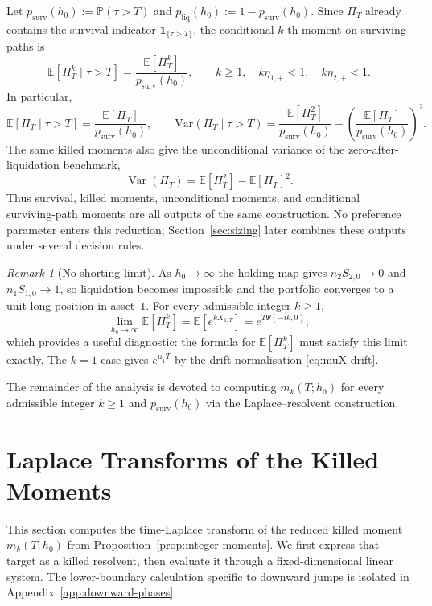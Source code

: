 \documentclass[11pt]{article}
\newcommand{\E}{\mathbb{E}}
\renewcommand{\P}{\mathbb{P}}
\newcommand{\one}{\mathbf{1}}
\theoremstyle{plain}
\theoremstyle{definition}
\theoremstyle{remark}
\newtheorem{remark}{Remark}
\begin{document}
Let $p_{\mathrm{surv}}(h_0):=\P(\tau>T)$ and $p_{\mathrm{liq}}(h_0):=1-p_{\mathrm{surv}}(h_0)$.
Since $\Pi_T$ already contains the survival indicator $\one_{\{\tau>T\}}$, the conditional $k$-th
moment on surviving paths is
\[
\E[\Pi_T^k\mid\tau>T]
=
\frac{\E[\Pi_T^k]}{p_{\mathrm{surv}}(h_0)},
\qquad k\ge 1,\quad k\eta_{1,+}<1,\quad k\eta_{2,+}<1.
\]
In particular,
\[
\E[\Pi_T\mid\tau>T]
=
\frac{\E[\Pi_T]}{p_{\mathrm{surv}}(h_0)},
\qquad
\mathrm{Var}(\Pi_T\mid\tau>T)
=
\frac{\E[\Pi_T^2]}{p_{\mathrm{surv}}(h_0)}
-
\left(\frac{\E[\Pi_T]}{p_{\mathrm{surv}}(h_0)}\right)^{\!2}.
\]
The same killed moments also give the unconditional variance of the zero-after-liquidation
benchmark,
\[
\operatorname{Var}(\Pi_T)=\E[\Pi_T^2]-\E[\Pi_T]^2.
\]
Thus survival, killed moments, unconditional moments, and conditional surviving-path
moments are all outputs of the same construction. No preference parameter enters this
reduction; Section~\ref{sec:sizing} later combines these outputs under several
decision rules.

\begin{remark}[No-shorting limit]\label{rem:no-shorting}
As $h_0\to\infty$ the holding map gives $n_2 S_{2,0}\to 0$ and $n_1 S_{1,0}\to 1$, so liquidation
becomes impossible and the portfolio converges to a unit long position in asset~$1$. For every
admissible integer $k\ge 1$,
\[
\lim_{h_0\to\infty}\E[\Pi_T^k]=\E[e^{kX_{1,T}}]=e^{T\Psi(-ik,0)},
\]
which provides a useful diagnostic: the formula for $\E[\Pi_T^k]$ must satisfy this limit exactly.
The $k=1$ case gives $e^{\mu_1 T}$ by the drift normalisation \eqref{eq:muX-drift}.
\end{remark}

The remainder of the analysis is devoted to computing $m_k(T;h_0)$ for every admissible integer $k\ge 1$
and $p_{\mathrm{surv}}(h_0)$ via the Laplace--resolvent construction.

\section{Laplace Transforms of the Killed Moments}\label{sec:resolvent}

This section computes the time-Laplace transform of the reduced killed
moment $m_k(T;h_0)$ from Proposition~\ref{prop:integer-moments}. We first express that target
as a killed resolvent, then evaluate it through a fixed-dimensional linear system. The
lower-boundary calculation specific to downward jumps is isolated in
Appendix~\ref{app:downward-phases}.
\end{document}
